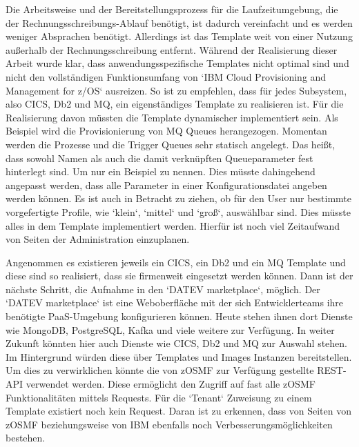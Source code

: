 Die Arbeitsweise und der Bereitstellungsprozess für die Laufzeitumgebung, die der Rechnungsschreibungs-Ablauf benötigt, ist dadurch vereinfacht und es werden weniger Absprachen benötigt.
Allerdings ist das Template weit von einer Nutzung außerhalb der Rechnungsschreibung entfernt.
Während der Realisierung dieser Arbeit wurde klar, dass anwendungsspezifische Templates nicht optimal sind und nicht den vollständigen Funktionsumfang von `IBM Cloud Provisioning and Management for z/OS` ausreizen.
So ist zu empfehlen, dass für jedes Subsystem, also CICS, Db2 und MQ, ein eigenständiges Template zu realisieren ist.
Für die Realisierung davon müssten die Template dynamischer implementiert sein.
Als Beispiel wird die Provisionierung von MQ Queues herangezogen.
Momentan werden die Prozesse und die Trigger Queues sehr statisch angelegt.
Das heißt, dass sowohl Namen als auch die damit verknüpften Queueparameter fest hinterlegt sind.
Um nur ein Beispiel zu nennen.
Dies müsste dahingehend angepasst werden, dass alle Parameter in einer Konfigurationsdatei angeben werden können.
Es ist auch in Betracht zu ziehen, ob für den User nur bestimmte vorgefertigte Profile, wie `klein`, `mittel` und `groß`, auswählbar sind.
Dies müsste alles in dem Template implementiert werden.
Hierfür ist noch viel Zeitaufwand von Seiten der Administration einzuplanen.

Angenommen es existieren jeweils ein CICS, ein Db2 und ein MQ Template und diese sind so realisiert, dass sie firmenweit eingesetzt werden können.
Dann ist der nächste Schritt, die Aufnahme in den `DATEV marketplace`, möglich.
Der `DATEV marketplace` ist eine Weboberfläche mit der sich Entwicklerteams ihre benötigte PaaS-Umgebung konfigurieren können.
Heute stehen ihnen dort Dienste wie MongoDB, PostgreSQL, Kafka und viele weitere zur Verfügung.
In weiter Zukunft könnten hier auch Dienste wie CICS, Db2 und MQ zur Auswahl stehen.
Im Hintergrund würden diese über Templates und Images Instanzen bereitstellen.
Um dies zu verwirklichen könnte die von zOSMF zur Verfügung gestellte REST-API verwendet werden.
Diese ermöglicht den Zugriff auf fast alle zOSMF Funktionalitäten mittels Requests.
Für die `Tenant` Zuweisung zu einem Template existiert noch kein Request.
Daran ist zu erkennen, dass von Seiten von zOSMF beziehungsweise von IBM ebenfalls noch Verbesserungsmöglichkeiten bestehen.


 